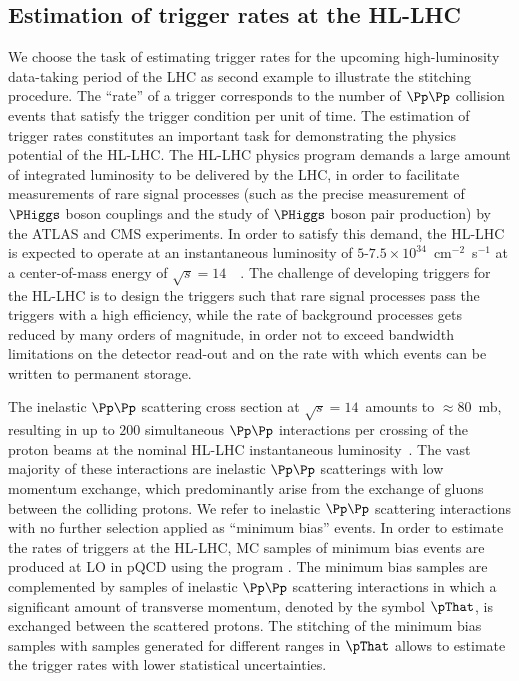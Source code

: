\subsection{Estimation of trigger rates at the HL-LHC}
\label{sec:examples_trigger_rate}

We choose the task of estimating trigger rates for the upcoming high-luminosity data-taking period of the LHC as second example to illustrate the stitching procedure.
The ``rate'' of a trigger corresponds to the number of $\Pp\Pp$ collision events that satisfy the trigger condition per unit of time.
The estimation of trigger rates constitutes an important task for demonstrating the physics potential of the HL-LHC.
The HL-LHC physics program demands a large amount of integrated luminosity to be delivered by the LHC, 
in order to facilitate measurements of rare signal processes
(such as the precise measurement of $\PHiggs$ boson couplings and the study of $\PHiggs$ boson pair production) by the ATLAS and CMS experiments.
In order to satisfy this demand, the HL-LHC is expected to operate at an instantaneous luminosity of $5$-$7.5 \times 10^{34}$~cm$^{-2}$~s$^{-1}$
at a center-of-mass energy of $\sqrt{s} = 14$~\TeV~\cite{TDR_Phase2_LHC}.
The challenge of developing triggers for the HL-LHC is to design the triggers such that rare signal processes pass the triggers with a high efficiency,
while the rate of background processes gets reduced by many orders of magnitude, in order not to exceed bandwidth limitations on the detector read-out 
and on the rate with which events can be written to permanent storage.

The inelastic $\Pp\Pp$ scattering cross section at $\sqrt{s} = 14$~\TeV amounts to $\approx 80$~mb,
resulting in up to $200$ simultaneous $\Pp\Pp$ interactions per crossing of the proton beams at the nominal HL-LHC instantaneous luminosity~\cite{TDR_Phase2_LHC}.
The vast majority of these interactions are inelastic $\Pp\Pp$ scatterings with low momentum exchange,
which predominantly arise from the exchange of gluons between the colliding protons.
We refer to inelastic $\Pp\Pp$ scattering interactions with no further selection applied as ``minimum bias'' events.
In order to estimate the rates of triggers at the HL-LHC,
MC samples of minimum bias events are produced at LO in pQCD using the program \PYTHIA.
The minimum bias samples are complemented by samples of inelastic $\Pp\Pp$ scattering interactions
in which a significant amount of transverse momentum, denoted by the symbol $\pThat$, is exchanged between the scattered protons.
The stitching of the minimum bias samples with samples generated for different ranges in $\pThat$ allows to estimate the trigger rates with lower statistical uncertainties.

